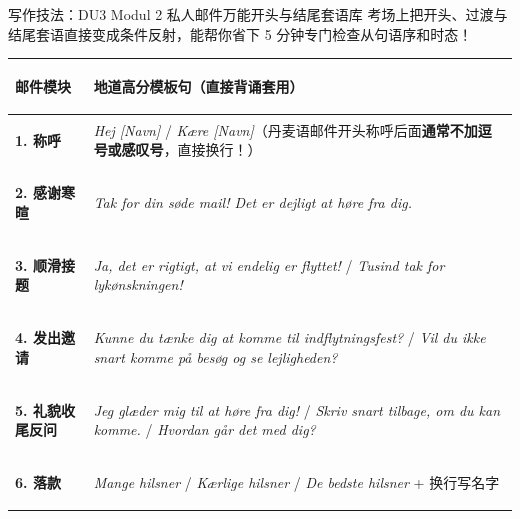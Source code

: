 \begin{grammatikbox}{写作技法：DU3 Modul 2 私人邮件万能开头与结尾套语库}
考场上把开头、过渡与结尾套语直接变成条件反射，能帮你省下 5 分钟专门检查从句语序和时态！

\vspace{0.3em}
\renewcommand{\arraystretch}{1.24}
{\small
\begin{tabularx}{\linewidth}{@{} >{\bfseries\raggedright\arraybackslash}p{2.6cm} >{\raggedright\arraybackslash}X @{}}
\toprule
\textbf{邮件模块} & \textbf{地道高分模板句（直接背诵套用）} \\
\midrule
\textbf{1. 称呼} & \textit{Hej [Navn]} / \textit{Kære [Navn]}（丹麦语邮件开头称呼后面\textbf{通常不加逗号或感叹号}，直接换行！） \\
\midrule
\textbf{2. 感谢寒暄} & \textit{Tak for din søde mail! Det er dejligt at høre fra dig.} \\
\midrule
\textbf{3. 顺滑接题} & \textit{Ja, det er rigtigt, at vi endelig er flyttet!} / \textit{Tusind tak for lykønskningen!} \\
\midrule
\textbf{4. 发出邀请} & \textit{Kunne du tænke dig at komme til indflytningsfest?} / \textit{Vil du ikke snart komme på besøg og se lejligheden?} \\
\midrule
\textbf{5. 礼貌收尾反问} & \textit{Jeg glæder mig til at høre fra dig!} / \textit{Skriv snart tilbage, om du kan komme.} / \textit{Hvordan går det med dig?} \\
\midrule
\textbf{6. 落款} & \textit{Mange hilsner} / \textit{Kærlige hilsner} / \textit{De bedste hilsner} + 换行写名字 \\
\bottomrule
\end{tabularx}
}
\end{grammatikbox}


